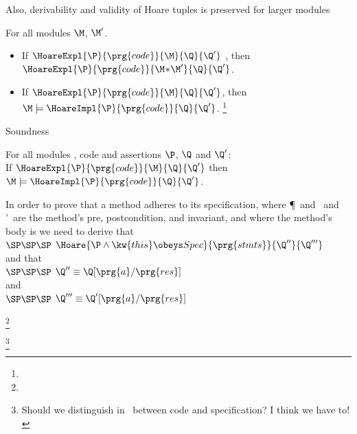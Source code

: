 Also,  derivability and validity of Hoare tuples is preserved for larger modules
\begin{theorem}
\label{lemma:hl:preserve}
For all modules $\M$, $\M'$.
\begin{itemize}
\item
If $\HoareExpl {\P} {\prg{code}}  {\M} {\Q} {\Q'}$ , then\\ $\HoareExpl {\P} {\prg{code}}  {\M\!*\!\M'} {\Q} {\Q'}$.
 
\item
If $\HoareExpl {\P} {\prg{code}}  {\M} {\Q} {\Q'}$, then \\ $\M \models \HoareImpl {\P} {\prg{code}} {\Q} {\Q'}$. \footnote{}
\end{itemize}
\end{theorem}

Soundness

\begin{theorem}
\label{lemma:hl:soundness}
 For all modules \M, code  and assertions $\P$, $\Q$ and $\Q'$:\\
 
\noindent
If $\HoareExpl {\P} {\prg{code}}{\M}  {\Q} {\Q'}$ then $\M \models \HoareImpl {\P} {\prg{code}} {\Q} {\Q'}$.  
\end{theorem}

\begin{definition}
In order to prove that a method adheres to its specification, 
  where \P\ and \Q \  and \Q'\ are the method's pre,   postcondition, and invariant, 
and where 
the method's body is
\semi {} 
we need to derive that \\
  $ \SP\SP\SP$ $\Hoare {\P\wedge \kw{this} \obeys Spec} {\prg{stmts}}  {\Q''} {\Q'''} $\\
and that \\
  $ \SP\SP\SP$  $\Q''\equiv \Q[\prg{a}/\prg{res}] \ $\\
 and\\
  $ \SP\SP\SP$  $\Q'''\equiv \Q'[\prg{a}/\prg{res}] \ $
\end{definition}\footnote{}

 
\footnote{Should we distinguish in \M\ between code and specification? I think we have to!}
 
